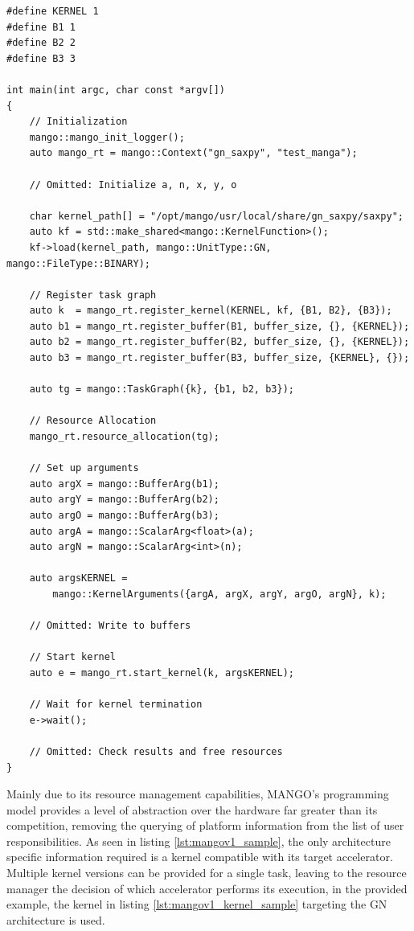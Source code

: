 \begin{lstlisting}[style=CStyle, caption=MANGO saxpy example (host), floatplacement=H, label={lst:mangov1_sample}]
#define KERNEL 1
#define B1 1
#define B2 2
#define B3 3

int main(int argc, char const *argv[])
{
    // Initialization
    mango::mango_init_logger();
    auto mango_rt = mango::Context("gn_saxpy", "test_manga");

    // Omitted: Initialize a, n, x, y, o

    char kernel_path[] = "/opt/mango/usr/local/share/gn_saxpy/saxpy";
    auto kf = std::make_shared<mango::KernelFunction>();
    kf->load(kernel_path, mango::UnitType::GN, mango::FileType::BINARY);

    // Register task graph
    auto k  = mango_rt.register_kernel(KERNEL, kf, {B1, B2}, {B3});
    auto b1 = mango_rt.register_buffer(B1, buffer_size, {}, {KERNEL});
    auto b2 = mango_rt.register_buffer(B2, buffer_size, {}, {KERNEL});
    auto b3 = mango_rt.register_buffer(B3, buffer_size, {KERNEL}, {});

    auto tg = mango::TaskGraph({k}, {b1, b2, b3});

    // Resource Allocation
    mango_rt.resource_allocation(tg);

    // Set up arguments
    auto argX = mango::BufferArg(b1);
    auto argY = mango::BufferArg(b2);
    auto argO = mango::BufferArg(b3);
    auto argA = mango::ScalarArg<float>(a);
    auto argN = mango::ScalarArg<int>(n);

    auto argsKERNEL = 
        mango::KernelArguments({argA, argX, argY, argO, argN}, k);

    // Omitted: Write to buffers

    // Start kernel
    auto e = mango_rt.start_kernel(k, argsKERNEL);

    // Wait for kernel termination
    e->wait();

    // Omitted: Check results and free resources
}
\end{lstlisting}

Mainly due to its resource management capabilities, MANGO's programming model provides a level of abstraction over the hardware far greater than its competition, removing the querying of platform information from the list of user responsibilities. 
As seen in listing \ref{lst:mangov1_sample}, the only architecture specific information required is a kernel compatible with its target accelerator. Multiple kernel versions can be provided for a single task, leaving to the resource manager the decision of which accelerator performs its execution, in the provided example, the kernel in listing \ref{lst:mangov1_kernel_sample} targeting the GN architecture is used. 

